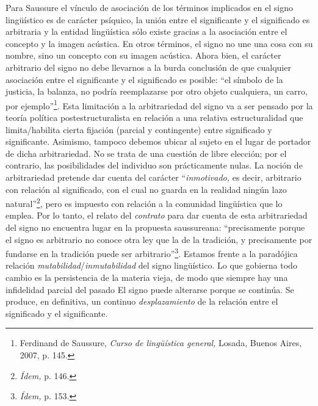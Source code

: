 Para Saussure el vínculo de asociación de los términos implicados en el signo lingüístico es de carácter psíquico, la unión entre el significante y el significado es arbitraria y la entidad lingüística sólo existe gracias a la asociación entre el concepto y la imagen acústica. En otros términos, el signo no une una cosa con su nombre, sino un concepto con su imagen acústica. Ahora bien, el carácter arbitrario del signo no debe llevarnos a la burda conclusión de que cualquier asociación entre el significante y el significado es posible: \enquote{el símbolo de la justicia, la balanza, no podría reemplazarse por otro objeto cualquiera, un carro, por ejemplo}\footnote{Ferdinand de Saussure, \emph{Curso de lingüística general,} Losada, Buenos Aires, 2007, p. 145.}. Esta limitación a la arbitrariedad del signo va a ser pensado por la teoría política postestructuralista en relación a una relativa estructuralidad que limita/habilita cierta fijación (parcial y contingente) entre significado y significante. Asimismo, tampoco debemos ubicar al sujeto en el lugar de portador de dicha arbitrariedad. No se trata de una cuestión de libre elección; por el contrario, las posibilidades del individuo son prácticamente nulas. La noción de arbitrariedad pretende dar cuenta del carácter \enquote{\emph{inmotivado,} es decir, arbitrario con relación al significado, con el cual no guarda en la realidad ningún lazo natural}\footnote{\emph{Ídem,} p. 146.}, pero es impuesto con relación a la comunidad lingüística que lo emplea. Por lo tanto, el relato del \emph{contrato} para dar cuenta de esta arbitrariedad del signo no encuentra lugar en la propuesta saussureana: \enquote{precisamente porque el signo es arbitrario no conoce otra ley que la de la tradición, y precisamente por fundarse en la tradición puede ser arbitrario}\footnote{\emph{Ídem,} p. 153.}. Estamos frente a la paradójica relación \emph{mutabilidad}/\emph{inmutabilidad} del signo lingüístico. Lo que gobierna todo cambio es la persistencia de la materia vieja, de modo que siempre hay una infidelidad parcial del pasado El signo puede alterarse porque se continúa. Se produce, en definitiva, un continuo \emph{desplazamiento} de la relación entre el significado y el significante.

